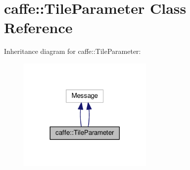\hypertarget{classcaffe_1_1_tile_parameter}{}\section{caffe\+:\+:Tile\+Parameter Class Reference}
\label{classcaffe_1_1_tile_parameter}


Inheritance diagram for caffe\+:\+:Tile\+Parameter\+:
\nopagebreak
\begin{figure}[H]
\begin{center}
\leavevmode
\includegraphics[width=185pt]{classcaffe_1_1_tile_parameter__inherit__graph}
\end{center}
\end{figure}
